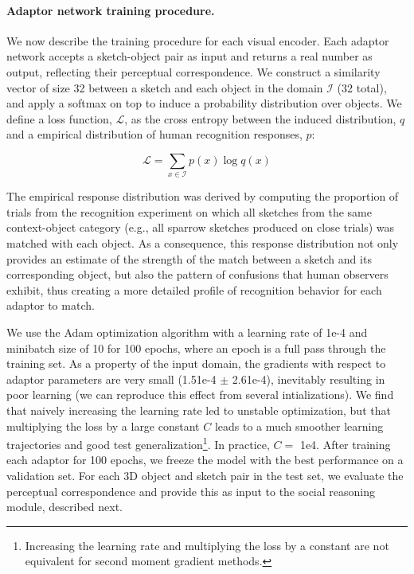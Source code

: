 \documentclass[9pt,twocolumn,twoside]{pnas-new}
\begin{document}
{\paragraph{Adaptor network training procedure.}
We now describe the training procedure for each visual encoder. Each adaptor network accepts a sketch-object pair as input and returns a real number as output, reflecting their perceptual correspondence. We construct a similarity vector of size 32 between a sketch and each object in the domain $\mathcal{I}$ (32 total), and apply a softmax on top to induce a probability distribution over objects. We define a loss function, $\mathcal{L}$, as the cross entropy between the induced distribution, $q$ and a empirical distribution of human recognition responses, $p$:

\begin{equation}
    \mathcal{L} = \sum_{x \in \mathcal{I}} p(x)\log q(x)
    \label{eqn:cross_entropy}
\end{equation}

The empirical response distribution was derived by computing the proportion of trials from the recognition experiment on which all sketches from the same context-object category (e.g., all sparrow sketches produced on close trials) was matched with each object. As a consequence, this response distribution not only provides an estimate of the strength of the match between a sketch and its corresponding object, but also the pattern of confusions that human observers exhibit, thus creating a more detailed profile of recognition behavior for each adaptor to match.

We use the Adam optimization algorithm \cite[]{kingma2014adam} with a learning rate of 1e-4 and minibatch size of 10 for 100 epochs, where an epoch is a full pass through the training set. As a property of the input domain, the gradients with respect to adaptor parameters are very small (1.51e-4 $\pm$ 2.61e-4), inevitably resulting in poor learning (we can reproduce this effect from several intializations). We find that naively increasing the learning rate led to unstable optimization, but that multiplying the loss by a large constant $C$ leads to a much smoother learning trajectories and good test generalization\footnote{Increasing the learning rate and multiplying the loss by a constant are not equivalent for second moment gradient methods.}. In practice, $C =$ 1e4. After training each adaptor for 100 epochs, we freeze the model with the best performance on a validation set. For each 3D object and sketch pair in the test set, we evaluate the perceptual correspondence and provide this as input to the social reasoning module, described next.

}
\end{document}

